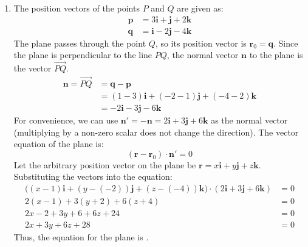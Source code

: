 \documentclass[12pt,a4paper]{article}
\begin{document}
\begin{enumerate}
\begin{tcolorbox}[enhanced,breakable,ansbox,colback=cD!4,colframe=cD,boxrule=0.8pt,arc=5pt,title={\textbf{Answer}},fonttitle=\bfseries\color{white},colbacktitle=cD]

\begin{enumerate}
    \item[\textbf{(a)}] The position vectors of the points $P$ and $Q$ are given as:
    \begin{align*}
        \mathbf{p} &= 3\mathbf{i} + \mathbf{j} + 2\mathbf{k} \\
        \mathbf{q} &= \mathbf{i} - 2\mathbf{j} - 4\mathbf{k}
    \end{align*}
    The plane passes through the point $Q$, so its position vector is $\mathbf{r}_0 = \mathbf{q}$. 
    Since the plane is perpendicular to the line $PQ$, the normal vector $\mathbf{n}$ to the plane is the vector $\vec{PQ}$.
    \begin{align*}
        \mathbf{n} = \vec{PQ} &= \mathbf{q} - \mathbf{p} \\
        &= (1 - 3)\mathbf{i} + (-2 - 1)\mathbf{j} + (-4 - 2)\mathbf{k} \\
        &= -2\mathbf{i} - 3\mathbf{j} - 6\mathbf{k}
    \end{align*}
    For convenience, we can use $\mathbf{n}' = -\mathbf{n} = 2\mathbf{i} + 3\mathbf{j} + 6\mathbf{k}$ as the normal vector (multiplying by a non-zero scalar does not change the direction).
    The vector equation of the plane is:
    \[ (\mathbf{r} - \mathbf{r}_0) \cdot \mathbf{n}' = 0 \]
    Let the arbitrary position vector on the plane be $\mathbf{r} = x\mathbf{i} + y\mathbf{j} + z\mathbf{k}$. Substituting the vectors into the equation:
    \begin{align*}
        \big( (x - 1)\mathbf{i} + (y - (-2))\mathbf{j} + (z - (-4))\mathbf{k} \big) \cdot (2\mathbf{i} + 3\mathbf{j} + 6\mathbf{k}) &= 0 \\
        2(x - 1) + 3(y + 2) + 6(z + 4) &= 0 \\
        2x - 2 + 3y + 6 + 6z + 24 &= 0 \\
        2x + 3y + 6z + 28 &= 0
    \end{align*}
    Thus, the equation for the plane is .


\end{enumerate}
\end{tcolorbox}
\end{enumerate}
\end{document}
